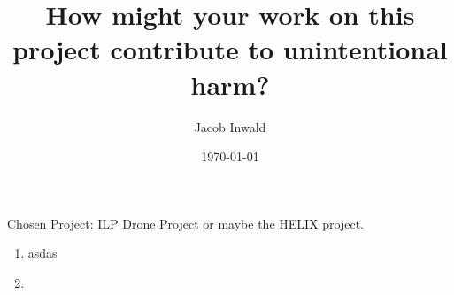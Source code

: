 \documentclass{article}
\title{How might your work on this project contribute to unintentional harm?}
\author{Jacob Inwald}
\date{\today}
\begin{document}
\maketitle

Chosen Project: ILP Drone Project or maybe the HELIX project. 
\begin{enumerate}
    \item asdas 
    \item   
\end{enumerate}


\printbibliography
\end{document}
